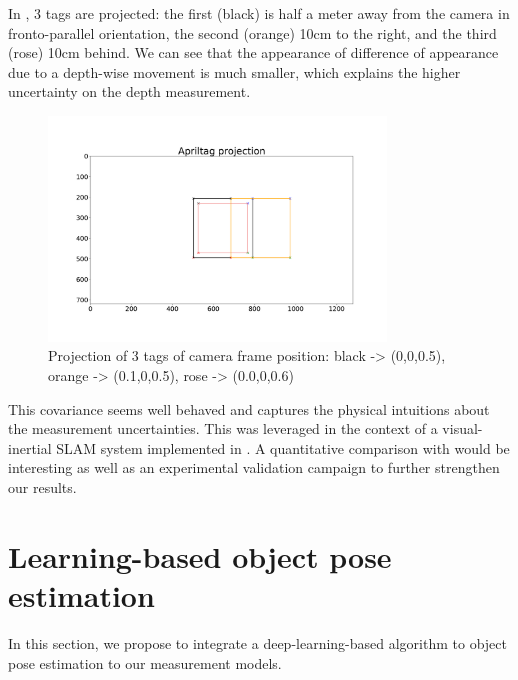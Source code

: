 In , 3 tags are projected: the first (black) is half a meter away from the camera in fronto-parallel orientation, the second (orange)
10cm to the right, and the third (rose) 10cm behind. We can see that the appearance of difference of appearance due to a depth-wise movement is much smaller, which 
explains the higher uncertainty on the depth measurement.

\begin{figure}[h]
    \centering
    \includegraphics[width=0.8\textwidth]{figures/apriltag_proj.pdf}
    \caption{Projection of 3 tags of camera frame position: black -> (0,0,0.5), orange -> (0.1,0,0.5), rose -> (0.0,0,0.6)}
    \label{fig:apriltag_proj}
\end{figure}

This covariance seems well behaved and captures the physical intuitions about the measurement uncertainties. 
This was leveraged in the context of a visual-inertial SLAM system implemented in . 
A quantitative comparison with \cite{urban2016mlpnp} would be interesting as well as an experimental validation campaign to further strengthen our results.


%
%
%
%
\section{Learning-based object pose estimation}
\label{sec:learning_based_object_pose_est}
In this section, we propose to integrate a deep-learning-based algorithm to object pose estimation \cite{labbe2020cosypose} to our measurement models. 


